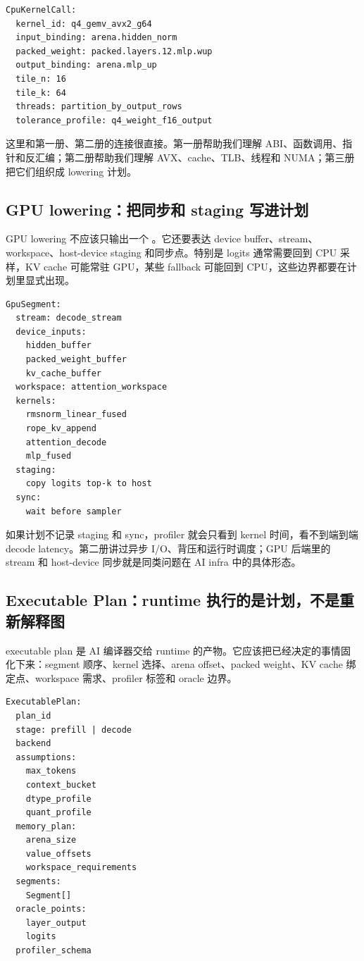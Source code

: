 \begin{lstlisting}[numbers=none,caption={CPU lowering 输出的计划片段}]
CpuKernelCall:
  kernel_id: q4_gemv_avx2_g64
  input_binding: arena.hidden_norm
  packed_weight: packed.layers.12.mlp.wup
  output_binding: arena.mlp_up
  tile_n: 16
  tile_k: 64
  threads: partition_by_output_rows
  tolerance_profile: q4_weight_f16_output
\end{lstlisting}

这里和第一册、第二册的连接很直接。第一册帮助我们理解 ABI、函数调用、指针和反汇编；第二册帮助我们理解 AVX、cache、TLB、线程和 NUMA；第三册把它们组织成 lowering 计划。

\subsection{GPU lowering：把同步和 staging 写进计划}

GPU lowering 不应该只输出一个 。它还要表达 device buffer、stream、workspace、host-device staging 和同步点。特别是 logits 通常需要回到 CPU 采样，KV cache 可能常驻 GPU，某些 fallback 可能回到 CPU，这些边界都要在计划里显式出现。

\begin{lstlisting}[numbers=none,caption={GPU lowering 输出的计划片段}]
GpuSegment:
  stream: decode_stream
  device_inputs:
    hidden_buffer
    packed_weight_buffer
    kv_cache_buffer
  workspace: attention_workspace
  kernels:
    rmsnorm_linear_fused
    rope_kv_append
    attention_decode
    mlp_fused
  staging:
    copy logits top-k to host
  sync:
    wait before sampler
\end{lstlisting}

如果计划不记录 staging 和 sync，profiler 就会只看到 kernel 时间，看不到端到端 decode latency。第二册讲过异步 I/O、背压和运行时调度；GPU 后端里的 stream 和 host-device 同步就是同类问题在 AI infra 中的具体形态。

\subsection{Executable Plan：runtime 执行的是计划，不是重新解释图}

executable plan 是 AI 编译器交给 runtime 的产物。它应该把已经决定的事情固化下来：segment 顺序、kernel 选择、arena offset、packed weight、KV cache 绑定点、workspace 需求、profiler 标签和 oracle 边界。

\begin{lstlisting}[numbers=none,caption={ExecutablePlan 的核心结构}]
ExecutablePlan:
  plan_id
  stage: prefill | decode
  backend
  assumptions:
    max_tokens
    context_bucket
    dtype_profile
    quant_profile
  memory_plan:
    arena_size
    value_offsets
    workspace_requirements
  segments:
    Segment[]
  oracle_points:
    layer_output
    logits
  profiler_schema
\end{lstlisting}

